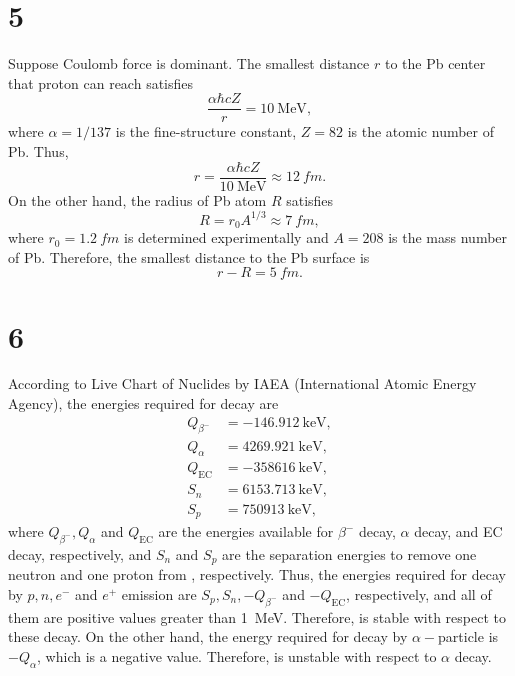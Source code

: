 \documentclass[a4paper,11pt]{jsarticle}
\begin{document}
\section*{5}

Suppose Coulomb force is dominant.
The smallest distance $r$ to the Pb center that proton can reach satisfies
\begin{equation}
  \frac{\alpha \hbar c Z }{r} = \SI{10}{\MeV},
\end{equation}
where $\alpha=1/137$ is the fine-structure constant, $Z=82$ is the atomic number of Pb.
Thus, 
\begin{equation}
  r = \frac{\alpha\hbar c Z}{\SI{10}{\MeV}} \approx \SI{12}{fm}.
\end{equation}
On the other hand, the radius of Pb atom $R$ satisfies
\begin{equation}
  R = r_0 A^{1/3} \approx \SI{7}{fm},
\end{equation}
where $r_0=\SI{1.2}{fm}$ is determined experimentally and $A=208$ is the mass number of Pb.
Therefore, the smallest distance to the Pb surface is 
\begin{equation}
  r - R = \SI{5}{fm}.
\end{equation}

\section*{6}
According to Live Chart of Nuclides by IAEA (International Atomic Energy Agency), the energies required for  decay are
\begin{align}
  Q_{\beta^-} &= -\SI{146.912}{\keV}, \\
  Q_{\alpha} &= \SI{4269.921}{\keV}, \\
  Q_{\mathrm{EC}} &= -\SI{358616}{\keV}, \\
  S_n &= \SI{6153.713}{\keV}, \\
  S_p &= \SI{750913}{\keV},
\end{align}
where $Q_{\beta^-}, Q_{\alpha}$ and $Q_{\mathrm{EC}}$ are the energies available for $\beta^-$ decay, $\alpha$ decay, and EC decay, respectively, and $S_n$ and $S_p$ are the separation energies to remove one neutron and one proton from , respectively.
Thus, the energies required for decay by $p, n, e^-$ and $e^+$ emission are $S_p, S_n, -Q_{\beta^-}$ and $-Q_{\mathrm{EC}}$, respectively, and all of them are positive values greater than \SI{1}{\MeV}.
Therefore,  is stable with respect to these decay.
On the other hand, the energy required for decay by $\alpha-$particle is $-Q_{\alpha}$, which is a negative value.
Therefore,  is unstable with respect to $\alpha$ decay.
\end{document}
